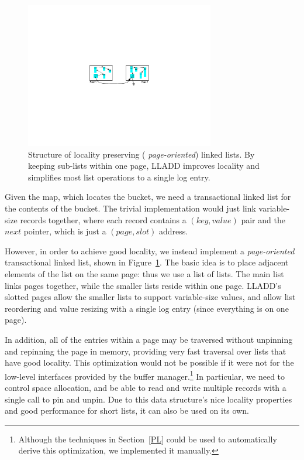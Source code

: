 \documentclass[10pt,letterpaper,twocolumn,english]{article}
\newcommand{\yad}{LLADD\xspace}
\begin{document}
\begin{figure}
\includegraphics[width=3.25in]{../paper2/LHT2.pdf}
\vspace{-12pt}
\caption{\sf\label{fig:LHT}Structure of locality preserving ({\em
page-oriented}) linked lists. By keeping sub-lists within one page,
\yad improves locality and simplifies most list operations to a single
log entry.}
\end{figure}

Given the map, which locates the bucket, we need a transactional
linked list for the contents of the bucket.  The trivial implementation
would just link variable-size records together, where each record
contains a $(key,value)$ pair and the $next$ pointer, which is just a
$(page,slot)$ address.

However, in order to achieve good locality, we instead implement a
{\em page-oriented} transactional linked list, shown in
Figure~\ref{fig:LHT}.  The basic idea is to place adjacent elements of
the list on the same page: thus we use a list of lists. The main list
links pages together, while the smaller lists reside within one
page. \yad's slotted pages allow the smaller lists to support
variable-size values, and allow list reordering and value resizing
with a single log entry (since everything is on one page).

In addition, all of the entries within a page may be traversed without
unpinning and repinning the page in memory, providing very fast
traversal over lists that have good locality.  This optimization would
not be possible if it were not for the low-level interfaces provided
by the buffer manager.\footnote{Although the techniques in Section~\ref{PL} 
could be used to automatically derive this optimization, we implemented 
it manually.}  In particular, we need to control space
allocation, and be able to read and write multiple records with a
single call to pin and unpin.  Due to this data structure's nice locality
properties and good performance for short lists, it can also be used
on its own.
\end{document}
